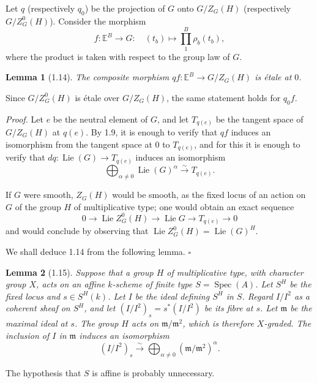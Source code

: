 \documentclass[10pt]{article}
\newcommand{\Spec}{\operatorname{Spec}}
\newcommand{\Lie}{\operatorname{Lie}}
\theoremstyle{deligne}
\newtheorem*{lemma*}{Lemma}
\newenvironment{proofdel}{\textit{Proof.}}{\hfill$\square$}
\begin{document}
Let \(q\) (respectively \(q_0\)) be the projection of \(G\) onto \(G/Z_G(H)\) (respectively \(G/Z^0_G(H)\)). Consider the morphism
\[
  f:\mathbb E^B\longrightarrow G:\quad (t_b)\longmapsto \prod_{1}^{B}\rho_b(t_b),
\]
where the product is taken with respect to the group law of \(G\).

\begin{lemma*}[1.14]
The composite morphism \(qf:\mathbb E^B\to G/Z_G(H)\) is étale at \(0\).
\end{lemma*}

Since \(G/Z^0_G(H)\) is étale over \(G/Z_G(H)\), the same statement holds for \(q_0f\).

\begin{proofdel}
Let \(e\) be the neutral element of \(G\), and let \(T_{q(e)}\) be the tangent space of \(G/Z_G(H)\) at \(q(e)\). By 1.9, it is enough to verify that \(qf\) induces an isomorphism from the tangent space at \(0\) to \(T_{q(e)}\), and for this it is enough to verify that \(dq:\Lie(G)\to T_{q(e)}\) induces an isomorphism
\[
  \bigoplus_{\alpha\ne0}\Lie(G)^\alpha \overset{\sim}{\longrightarrow} T_{q(e)}.
\]

If \(G\) were smooth, \(Z_G(H)\) would be smooth, as the fixed locus of an action on \(G\) of the group \(H\) of multiplicative type; one would obtain an exact sequence
\[
  0\longrightarrow \Lie Z^0_G(H)\longrightarrow \Lie G\longrightarrow T_{q(e)}\longrightarrow0
\]
and would conclude by observing that \(\Lie Z^0_G(H)=\Lie(G)^H\).

We shall deduce 1.14 from the following lemma.
\end{proofdel}

\begin{lemma*}[1.15]
Suppose that a group \(H\) of multiplicative type, with character group \(X\), acts on an affine \(k\)-scheme of finite type \(S=\Spec(A)\). Let \(S^H\) be the fixed locus and \(s\in S^H(k)\). Let \(I\) be the ideal defining \(S^H\) in \(S\). Regard \(I/I^2\) as a coherent sheaf on \(S^H\), and let \((I/I^2)_s=s^*(I/I^2)\) be its fibre at \(s\). Let \(\mathfrak m\) be the maximal ideal at \(s\). The group \(H\) acts on \(\mathfrak m/\mathfrak m^2\), which is therefore \(X\)-graded. The inclusion of \(I\) in \(\mathfrak m\) induces an isomorphism
\[
  (I/I^2)_s \overset{\sim}{\longrightarrow}
  \bigoplus_{\alpha\ne0}(\mathfrak m/\mathfrak m^2)^\alpha .
  \tag{1.15.1}
\]
\end{lemma*}

The hypothesis that \(S\) is affine is probably unnecessary.
\end{document}
